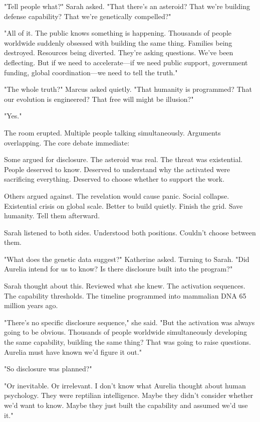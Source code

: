 "Tell people what?" Sarah asked. "That there's an asteroid? That we're building defense capability? That we're genetically compelled?"

"All of it. The public knows something is happening. Thousands of people worldwide suddenly obsessed with building the same thing. Families being destroyed. Resources being diverted. They're asking questions. We've been deflecting. But if we need to accelerate—if we need public support, government funding, global coordination—we need to tell the truth."

"The whole truth?" Marcus asked quietly. "That humanity is programmed? That our evolution is engineered? That free will might be illusion?"

"Yes."

The room erupted. Multiple people talking simultaneously. Arguments overlapping. The core debate immediate:

Some argued for disclosure. The asteroid was real. The threat was existential. People deserved to know. Deserved to understand why the activated were sacrificing everything. Deserved to choose whether to support the work.

Others argued against. The revelation would cause panic. Social collapse. Existential crisis on global scale. Better to build quietly. Finish the grid. Save humanity. Tell them afterward.

Sarah listened to both sides. Understood both positions. Couldn't choose between them.

"What does the genetic data suggest?" Katherine asked. Turning to Sarah. "Did Aurelia intend for us to know? Is there disclosure built into the program?"

Sarah thought about this. Reviewed what she knew. The activation sequences. The capability thresholds. The timeline programmed into mammalian DNA 65 million years ago.

"There's no specific disclosure sequence," she said. "But the activation was always going to be obvious. Thousands of people worldwide simultaneously developing the same capability, building the same thing? That was going to raise questions. Aurelia must have known we'd figure it out."

"So disclosure was planned?"

"Or inevitable. Or irrelevant. I don't know what Aurelia thought about human psychology. They were reptilian intelligence. Maybe they didn't consider whether we'd want to know. Maybe they just built the capability and assumed we'd use it."

